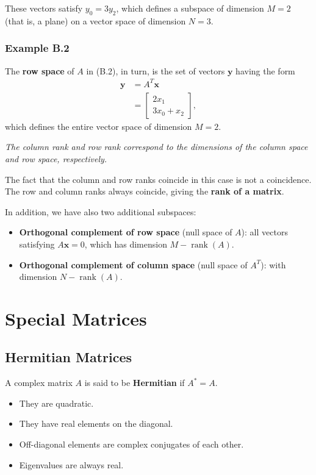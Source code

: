 These vectors satisfy $y_0 = 3y_2$, which defines a subspace of dimension $M = 2$ (that is, a plane)  
on a vector space of dimension $N = 3$.

\subsubsection*{Example B.2}

The \textbf{row space} of $A$ in (B.2), in turn, is the set of vectors $\mathbf{y}$ having the form
\begin{align}
\mathbf{y} &= A^T \mathbf{x} \tag{B.5} \\[6pt]
&=
\begin{bmatrix}
2x_1 \\
3x_0 + x_2
\end{bmatrix},
\tag{B.6}
\end{align}
which defines the entire vector space of dimension $M = 2$.

\medskip

\textit{The column rank and row rank correspond to the dimensions of the column space and row space, respectively.}

The fact that the column and row ranks coincide in this case is not a coincidence.  
The row and column ranks always coincide, giving the \textbf{rank of a matrix}.

In addition, we have also two additional subspaces:

\begin{itemize}
    \item \textbf{Orthogonal complement of row space} (null space of $A$): all vectors satisfying $A\mathbf{x} = 0$, which has dimension $M - \operatorname{rank}(A)$.
    \item \textbf{Orthogonal complement of column space} (null space of $A^T$): with dimension $N - \operatorname{rank}(A)$.
\end{itemize}

\section*{Special Matrices}

\subsection*{Hermitian Matrices}

A complex matrix $A$ is said to be \textbf{Hermitian} if $A^* = A$.

\begin{itemize}
    \item They are quadratic.  
    \item They have real elements on the diagonal.  
    \item Off-diagonal elements are complex conjugates of each other.  
    \item Eigenvalues are always real.
\end{itemize}

